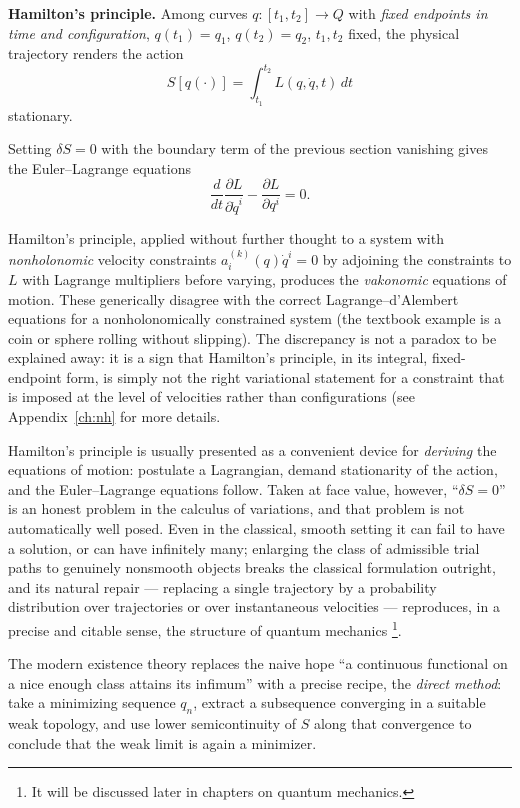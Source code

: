 \begin{definition}
\textbf{Hamilton's principle.} Among curves $q:[t_1,t_2]\to Q$ with 
    \emph{fixed endpoints in time and configuration}, 
    $q(t_1)=q_1$, $q(t_2)=q_2$, $t_1,t_2$ fixed, 
    the physical trajectory renders the action
\[
S[q(\cdot)] = \int_{t_1}^{t_2} L(q,\dot q,t)\,dt
\]
stationary.
\end{definition}

Setting $\delta S=0$ with the boundary term of the previous section 
vanishing gives the Euler--Lagrange equations
\[
\frac{d}{dt}\frac{\partial L}{\partial \dot q^i} 
- \frac{\partial L}{\partial q^i} = 0 .
\]

Hamilton's principle, applied without further thought to a system with
\emph{nonholonomic} velocity constraints $a^{(k)}_i(q)\dot q^i=0$ by adjoining
the constraints to $L$ with Lagrange multipliers before varying, produces the
\emph{vakonomic} equations of motion. These generically disagree with the
correct Lagrange--d'Alembert equations for a nonholonomically constrained
system (the textbook example is a coin or sphere rolling without slipping). The
discrepancy is not a paradox to be explained away: it is a sign that Hamilton's
principle, in its integral, fixed-endpoint form, is simply not the right
variational statement for a constraint that is imposed at the level of
velocities rather than configurations (see Appendix~\ref{ch:nh} for more
details.

Hamilton's principle is usually presented as a convenient device for
\emph{deriving} the equations of motion: postulate a Lagrangian, demand
stationarity of the action, and the Euler--Lagrange equations follow. Taken at
face value, however, ``$\delta S=0$'' is an honest problem in the calculus of
variations, and that problem is not automatically well posed. Even in the
classical, smooth setting it can fail to have a solution, or can have
infinitely many; enlarging the class of admissible trial paths to genuinely
nonsmooth objects breaks the classical formulation outright, and its natural
repair --- replacing a single trajectory by a probability distribution over
trajectories or over instantaneous velocities --- reproduces, in a precise and
citable sense, the structure of quantum mechanics \footnote{It will be 
discussed later in chapters on quantum mechanics.}. 

The modern existence theory replaces the naive hope ``a continuous functional
on a nice enough class attains its infimum'' with a precise recipe, the
\emph{direct method}: take a minimizing sequence $q_n$, extract a subsequence
converging in a suitable weak topology, and use lower semicontinuity of $S$
along that convergence to conclude that the weak limit is again a minimizer.

